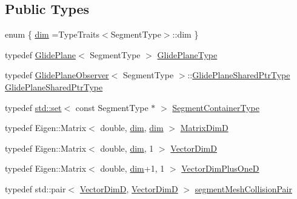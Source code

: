 \subsection*{Public Types}
\begin{DoxyCompactItemize}
\item 
enum \{ \hyperlink{classmodel_1_1_glide_plane_a04b3bf7d148a6d0624ab6fb63d6cf657a49f9a500624007dd90e2a82c8a2b699d}{dim} =Type\+Traits$<$Segment\+Type$>$\+:\+:dim
 \}
\item 
typedef \hyperlink{classmodel_1_1_glide_plane}{Glide\+Plane}$<$ Segment\+Type $>$ \hyperlink{classmodel_1_1_glide_plane_af25a804a008e811823421118eb164531}{Glide\+Plane\+Type}
\item 
typedef \hyperlink{structmodel_1_1_glide_plane_observer}{Glide\+Plane\+Observer}$<$ Segment\+Type $>$\+::\hyperlink{classmodel_1_1_glide_plane_a3f02a68389497ce7dbcc0c3733ba6a01}{Glide\+Plane\+Shared\+Ptr\+Type} \hyperlink{classmodel_1_1_glide_plane_a3f02a68389497ce7dbcc0c3733ba6a01}{Glide\+Plane\+Shared\+Ptr\+Type}
\item 
typedef \hyperlink{plot_cells_8m_a03623d69001c34fc77654be29bdc3d8a}{std\+::set}$<$ const Segment\+Type $\ast$ $>$ \hyperlink{classmodel_1_1_glide_plane_a8b17e4dc70e2acbdd8ad502891c74fc2}{Segment\+Container\+Type}
\item 
typedef Eigen\+::\+Matrix$<$ double, \hyperlink{classmodel_1_1_glide_plane_a04b3bf7d148a6d0624ab6fb63d6cf657a49f9a500624007dd90e2a82c8a2b699d}{dim}, \hyperlink{classmodel_1_1_glide_plane_a04b3bf7d148a6d0624ab6fb63d6cf657a49f9a500624007dd90e2a82c8a2b699d}{dim} $>$ \hyperlink{classmodel_1_1_glide_plane_a2572e44eea5edb4ff9b1dba0d14a18ab}{Matrix\+Dim\+D}
\item 
typedef Eigen\+::\+Matrix$<$ double, \hyperlink{classmodel_1_1_glide_plane_a04b3bf7d148a6d0624ab6fb63d6cf657a49f9a500624007dd90e2a82c8a2b699d}{dim}, 1 $>$ \hyperlink{classmodel_1_1_glide_plane_a2bb10efbec7067be952e933cdeb21ce7}{Vector\+Dim\+D}
\item 
typedef Eigen\+::\+Matrix$<$ double, \hyperlink{classmodel_1_1_glide_plane_a04b3bf7d148a6d0624ab6fb63d6cf657a49f9a500624007dd90e2a82c8a2b699d}{dim}+1, 1 $>$ \hyperlink{classmodel_1_1_glide_plane_a8516128be029a332197dedbd1abb3a7c}{Vector\+Dim\+Plus\+One\+D}
\item 
typedef std\+::pair$<$ \hyperlink{classmodel_1_1_glide_plane_a2bb10efbec7067be952e933cdeb21ce7}{Vector\+Dim\+D}, \hyperlink{classmodel_1_1_glide_plane_a2bb10efbec7067be952e933cdeb21ce7}{Vector\+Dim\+D} $>$ \hyperlink{classmodel_1_1_glide_plane_ad28fb04f6f870da35e376e3ffa602fbd}{segment\+Mesh\+Collision\+Pair}

\end{DoxyCompactItemize}
